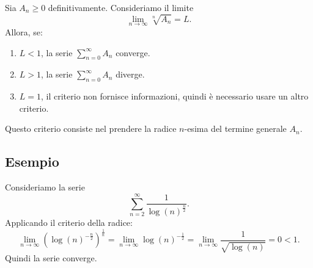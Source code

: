 \documentclass[12pt]{article}  %
\begin{document}
Sia $A_n \geq 0$ definitivamente. Consideriamo il limite
\[
\lim_{n \to \infty} \sqrt[n]{A_n} = L.
\]
Allora, se:
\begin{enumerate}
    \item $L < 1$, la serie $\sum_{n=0}^{\infty} A_n$ converge.
    \item $L > 1$, la serie $\sum_{n=0}^{\infty} A_n$ diverge.
    \item $L = 1$, il criterio non fornisce informazioni, quindi è necessario usare un altro criterio.
\end{enumerate}

Questo criterio consiste nel prendere la radice $n$-esima del termine generale $A_n$.

\subsection*{Esempio}

Consideriamo la serie
\[
\sum_{n=2}^{\infty} \frac{1}{\log(n)^{\frac{n}{2}}}.
\]
Applicando il criterio della radice:
\[
\lim_{n \to \infty} \left( \log(n)^{-\frac{n}{2}} \right)^{\frac{1}{n}} = \lim_{n \to \infty} \log(n)^{-\frac{1}{2}} = \lim_{n \to \infty} \frac{1}{\sqrt{\log(n)}} = 0 < 1.
\]
Quindi la serie converge.
\end{document}
